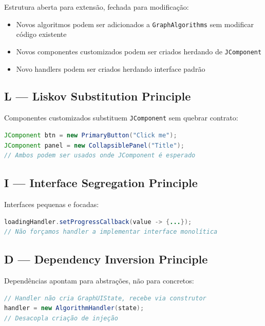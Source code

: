 \documentclass[12pt,a4paper]{article}
\begin{document}
    Estrutura aberta para extensão, fechada para modificação:

    \begin{itemize}
        \item Novos algoritmos podem ser adicionados a \texttt{GraphAlgorithms} sem modificar código existente
        \item Novos componentes customizados podem ser criados herdando de \texttt{JComponent}
        \item Novo handlers podem ser criados herdando interface padrão
    \end{itemize}

    \subsection{L — Liskov Substitution Principle}

    Componentes customizados substituem \texttt{JComponent} sem quebrar contrato:

    \begin{lstlisting}[language=Java, caption=LSP em Componentes Customizados]
JComponent btn = new PrimaryButton("Click me");
JComponent panel = new CollapsiblePanel("Title");
// Ambos podem ser usados onde JComponent é esperado
    \end{lstlisting}

    \subsection{I — Interface Segregation Principle}

    Interfaces pequenas e focadas:

    \begin{lstlisting}[language=Java, caption=ISP em Listeners]
loadingHandler.setProgressCallback(value -> {...});
// Não forçamos handler a implementar interface monolítica
    \end{lstlisting}

    \subsection{D — Dependency Inversion Principle}

    Dependências apontam para abstrações, não para concretos:

    \begin{lstlisting}[language=Java, caption=DIP em Handlers]
// Handler não cria GraphUIState, recebe via construtor
handler = new AlgorithmHandler(state);
// Desacopla criação de injeção
    \end{lstlisting}
\end{document}
